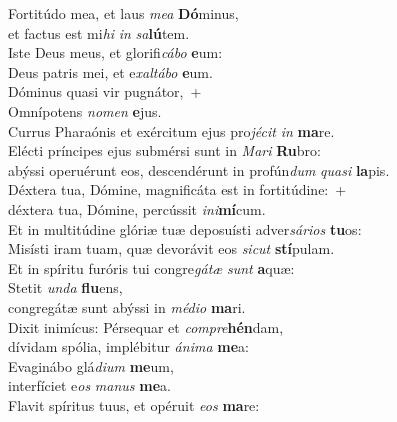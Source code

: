 \evenverse Fortitúdo mea, et laus \textit{me}\textit{a} \textbf{Dó}minus,~\*\\
\evenverse et factus est mi\textit{hi} \textit{in} \textit{sa}\textbf{lú}tem.\\
\oddverse Iste Deus meus, et glorifi\textit{cá}\textit{bo} \textbf{e}um:~\*\\
\oddverse Deus patris mei, et e\textit{xal}\textit{tá}\textit{bo} \textbf{e}um.\\
\evenverse Dóminus quasi vir pugnátor,~+\\
\evenverse  Omnípotens \textit{no}\textit{men} \textbf{e}jus.~\*\\
\evenverse Currus Pharaónis et exércitum ejus pro\textit{jé}\textit{cit} \textit{in} \textbf{ma}re.\\
\oddverse Elécti príncipes ejus submérsi sunt in \textit{Ma}\textit{ri} \textbf{Ru}bro:~\*\\
\oddverse abýssi operuérunt eos, descendérunt in profún\textit{dum} \textit{qua}\textit{si} \textbf{la}pis.\\
\evenverse Déxtera tua, Dómine, magnificáta est in fortitúdine:~+\\
\evenverse  déxtera tua, Dómine, percússit \textit{i}\textit{ni}\textbf{mí}cum.~\*\\
\evenverse Et in multitúdine glóriæ tuæ deposuísti adver\textit{sá}\textit{ri}\textit{os} \textbf{tu}os:\\
\oddverse Misísti iram tuam, quæ devorávit eos \textit{si}\textit{cut} \textbf{stí}pulam.~\*\\
\oddverse Et in spíritu furóris tui congre\textit{gá}\textit{tæ} \textit{sunt} \textbf{a}quæ:\\
\evenverse Stetit \textit{un}\textit{da} \textbf{flu}ens,~\*\\
\evenverse congregátæ sunt abýssi in \textit{mé}\textit{di}\textit{o} \textbf{ma}ri.\\
\oddverse Dixit inimícus: Pérsequar et \textit{com}\textit{pre}\textbf{hén}dam,~\*\\
\oddverse dívidam spólia, implébitur \textit{á}\textit{ni}\textit{ma} \textbf{me}a:\\
\evenverse Evaginábo glá\textit{di}\textit{um} \textbf{me}um,~\*\\
\evenverse interfíciet e\textit{os} \textit{ma}\textit{nus} \textbf{me}a.\\
\oddverse Flavit spíritus tuus, et opéruit \textit{e}\textit{os} \textbf{ma}re:~\*\\
